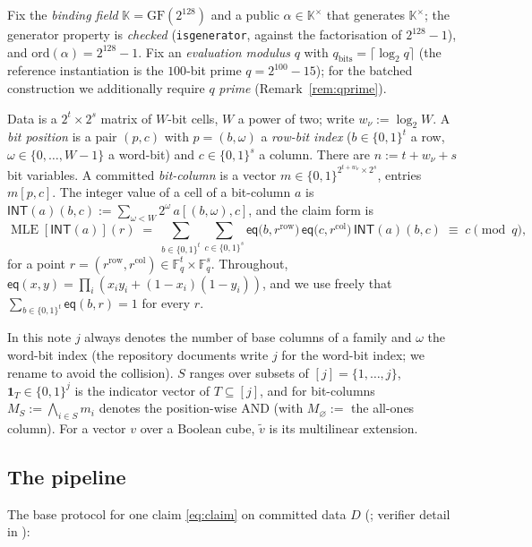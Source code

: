 \documentclass[11pt]{article}
\newcommand{\F}{\mathbb{F}}
\newcommand{\K}{\mathbb{K}}            %
\newcommand{\Kx}{\K^{\times}}
\newcommand{\Fq}{\F_q}                 %
\newcommand{\bits}{\{0,1\}}
\newcommand{\INT}{\mathsf{INT}}
\newcommand{\mle}[1]{\widetilde{#1}}
\newcommand{\eq}{\mathsf{eq}}
\newcommand{\orda}{\mathrm{ord}}
\DeclareRobustCommand{\code}[1]{{\def\_{\textunderscore\allowbreak}\texttt{#1}}}
\DeclareMathOperator{\MLE}{MLE}
\theoremstyle{plain}
\theoremstyle{definition}
\theoremstyle{remark}
\begin{document}
Fix the \emph{binding field} $\K=\mathrm{GF}(2^{128})$ and a public
$\alpha\in\Kx$ that generates $\Kx$; the generator property is \emph{checked}
(\code{is\_generator}, against the factorisation of $2^{128}-1$), and
$\orda(\alpha)=2^{128}-1$. Fix an \emph{evaluation modulus} $q$ with
$q_{\mathrm{bits}}=\lceil\log_2 q\rceil$ (the reference instantiation is the
$100$-bit prime $q=2^{100}-15$); for the batched construction we additionally
require $q$ \emph{prime} (Remark~\ref{rem:qprime}).

Data is a $2^{t}\times 2^{s}$ matrix of $W$-bit cells, $W$ a power of two;
write $w_\nu:=\log_2 W$. A \emph{bit position} is a pair $(p,c)$ with
$p=(b,\omega)$ a \emph{row-bit index} ($b\in\bits^{t}$ a row,
$\omega\in\{0,\dots,W-1\}$ a word-bit) and $c\in\bits^{s}$ a column. There are
$n := t + w_\nu + s$ bit variables. A committed \emph{bit-column} is a vector
$m\in\bits^{2^{t+w_\nu}\times 2^{s}}$, entries $m[p,c]$. The integer value of a
cell of a bit-column $a$ is
$\INT(a)(b,c) := \sum_{\omega<W} 2^{\omega}\, a[(b,\omega),c]$, and the claim
form is
\begin{equation}\label{eq:claim}
  \MLE[\INT(a)](r)
  \;=\; \sum_{b\in\bits^{t}}\sum_{c\in\bits^{s}}
        \eq\bigl(b,r^{\mathrm{row}}\bigr)\,\eq\bigl(c,r^{\mathrm{col}}\bigr)\,
        \INT(a)(b,c)
  \;\equiv\; c \pmod q ,
\end{equation}
for a point $r=(r^{\mathrm{row}},r^{\mathrm{col}})\in\Fq^{t}\times\Fq^{s}$.
Throughout, $\eq(x,y)=\prod_i (x_iy_i+(1-x_i)(1-y_i))$, and we use freely that
$\sum_{b\in\bits^{t}}\eq(b,r)=1$ for every $r$.

In this note $j$ always denotes the number of base columns of a family and
$\omega$ the word-bit index (the repository documents write $j$ for the
word-bit index; we rename to avoid the collision). $S$ ranges over subsets of
$[j]=\{1,\dots,j\}$, $\mathbf{1}_T\in\bits^{j}$ is the indicator vector of
$T\subseteq[j]$, and for bit-columns $M_S := \bigwedge_{i\in S} m_i$ denotes
the position-wise AND (with $M_\varnothing :=$ the all-ones column). For a
vector $v$ over a Boolean cube, $\mle{v}$ is its multilinear extension.

\subsection{The pipeline}\label{sec:pipeline}

The base protocol for one claim \eqref{eq:claim} on committed data $D$
(\cite{F2Zdesign}; verifier detail in \cite{F2Zverifier}):
\end{document}
